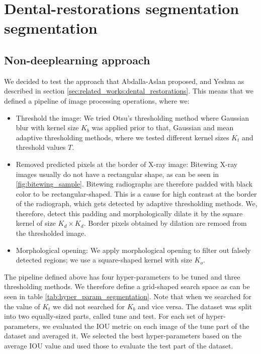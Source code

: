 \section{Dental-restorations segmentation segmentation}
\subsection{Non-deeplearning approach}
We decided to test the approach that Abdalla-Aslan proposed, and Yeshua \cite{AbdallaAslan2020, Yeshua2019} as described in section \ref{sec:related_works:dental_restorations}. This means that we defined a pipeline of image processing operations, where we:
\begin{itemize}
    \item Threshold the image: We tried Otsu's thresholding method where Gaussian blur with kernel size $K_b$ was applied prior to that, Gaussian and mean adaptive thresholding methods, where we tested different kernel sizes $K_t$ and threshold values $T$.
    \item Removed predicted pixels at the border of X-ray image: Bitewing X-ray images usually do not have a rectangular shape, as can be seen in \ref{fig:bitewing_sample}. Bitewing radiographs are therefore padded with black color to be rectangular-shaped. This is a cause for high contrast at the border of the radiograph, which gets detected by adaptive thresholding methods. We, therefore, detect this padding and morphologically dilate it by the square kernel of size $K_d \times K_d$. Border pixels obtained by dilation are remoed from the thresholded image.
    \item Morphological opening: We apply morphological opening to filter out falsely detected regions; we use a square-shaped kernel with size $K_o$.
\end{itemize}

The pipeline defined above has four hyper-parameters to be tuned and three thresholding methods. We therefore define a grid-shaped search space as can be seen in table \ref{tab:hyper_param_segmentation}. Note that when we searched for the value of $K_t$ we did not searched for $K_b$ and vice versa.
The dataset was split into two equally-sized parts, called tune and test. For each set of hyper-parameters, we evaluated the IOU metric on each image of the tune part of the dataset and averaged it. We selected the best hyper-parameters based on the average IOU value and used those to evaluate the test part of the dataset.

